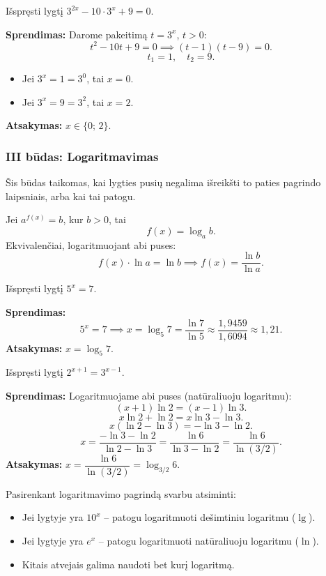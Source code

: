 \begin{example}
Išspręsti lygtį $3^{2x} - 10 \cdot 3^{x} + 9 = 0$.

\textbf{Sprendimas:} Darome pakeitimą $t = 3^x$, $t > 0$:
\[
t^2 - 10t + 9 = 0 \implies (t-1)(t-9) = 0.
\]
\[
t_1 = 1, \quad t_2 = 9.
\]
\begin{itemize}
    \item Jei $3^x = 1 = 3^0$, tai $x = 0$.
    \item Jei $3^x = 9 = 3^2$, tai $x = 2$.
\end{itemize}
\textbf{Atsakymas:} $x \in \{0;\, 2\}$.
\end{example}

\subsubsection*{III būdas: Logaritmavimas}

Šis būdas taikomas, kai lygties pusių negalima išreikšti to paties pagrindo laipsniais, 
arba kai tai patogu.

\begin{theorem}
Jei $a^{f(x)} = b$, kur $b > 0$, tai
\[
f(x) = \log_a b.
\]
Ekvivalenčiai, logaritmuojant abi puses:
\[
f(x) \cdot \ln a = \ln b \implies f(x) = \frac{\ln b}{\ln a}.
\]
\end{theorem}

\begin{example}
Išspręsti lygtį $5^{x} = 7$.

\textbf{Sprendimas:}
\[
5^x = 7 \implies x = \log_5 7 = \frac{\ln 7}{\ln 5} \approx \frac{1{,}9459}{1{,}6094} \approx 1{,}21.
\]
\textbf{Atsakymas:} $x = \log_5 7$.
\end{example}

\begin{example}
Išspręsti lygtį $2^{x+1} = 3^{x-1}$.

\textbf{Sprendimas:} Logaritmuojame abi puses (natūraliuoju logaritmu):
\[
(x+1)\ln 2 = (x-1)\ln 3.
\]
\[
x \ln 2 + \ln 2 = x \ln 3 - \ln 3.
\]
\[
x(\ln 2 - \ln 3) = -\ln 3 - \ln 2.
\]
\[
x = \frac{-\ln 3 - \ln 2}{\ln 2 - \ln 3} = \frac{\ln 6}{\ln 3 - \ln 2} = \frac{\ln 6}{\ln(3/2)}.
\]
\textbf{Atsakymas:} $x = \dfrac{\ln 6}{\ln(3/2)} = \log_{3/2} 6$.
\end{example}

\begin{remark}
Pasirenkant logaritmavimo pagrindą svarbu atsiminti:
\begin{itemize}
    \item Jei lygtyje yra $10^x$ – patogu logaritmuoti dešimtiniu logaritmu ($\lg$).
    \item Jei lygtyje yra $e^x$ – patogu logaritmuoti natūraliuoju logaritmu ($\ln$).
    \item Kitais atvejais galima naudoti bet kurį logaritmą.
\end{itemize}
\end{remark}


